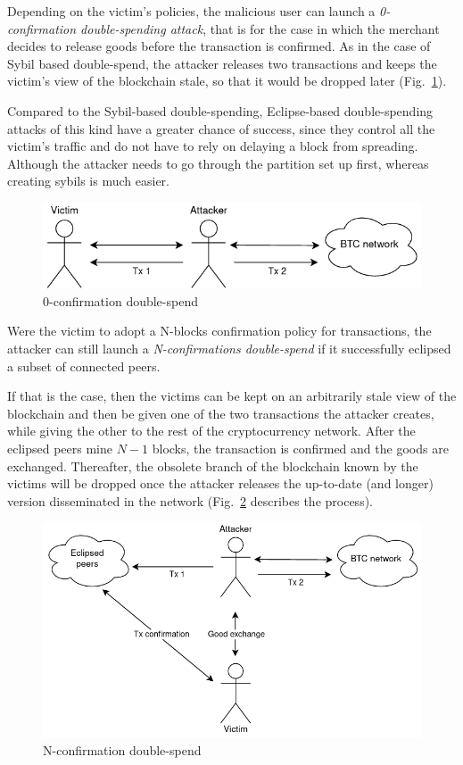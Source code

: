 \documentclass[12pt, letterpaper, twoside]{article}
\begin{document}
Depending on the victim's policies, the malicious user can launch a \textit{0-confirmation double-spending attack}, that is for the case in which the merchant decides to release goods before the transaction is confirmed. As in the case of Sybil based double-spend, the attacker releases two transactions and keeps the victim's view of the blockchain stale, so that it would be dropped later (Fig.~\ref{fig:0confirm}).

Compared to the Sybil-based double-spending, Eclipse-based double-spending attacks of this kind have a greater chance of success, since they control all the victim's traffic and do not have to rely on delaying a block from spreading. Although the attacker needs to go through the partition set up first, whereas creating sybils is much easier.

\begin{figure}[h!]
	\includegraphics[width=.7\textwidth]{pict/0confirm-doublespend.png}
	\centering
	\caption{0-confirmation double-spend}
	\label{fig:0confirm}
\end{figure}

Were the victim to adopt a N-blocks confirmation policy for transactions, the attacker can still launch a \textit{N-confirmations double-spend} if it successfully eclipsed a subset of connected peers.

If that is the case, then the victims can be kept on an arbitrarily stale view of the blockchain and then be given one of the two transactions the attacker creates, while giving the other to the rest of the cryptocurrency network. After the eclipsed peers mine $N - 1$ blocks, the transaction is confirmed and the goods are exchanged. Thereafter, the obsolete branch of the blockchain known by the victims will be dropped once the attacker releases the up-to-date (and longer) version disseminated in the network (Fig.~\ref{fig:nconfirm} describes the process).

\begin{figure}[h!]
	\includegraphics[width=.75\textwidth]{pict/nconfirm-doublespend.png}
	\centering
	\caption{N-confirmation double-spend}
	\label{fig:nconfirm}
\end{figure}
\end{document}
